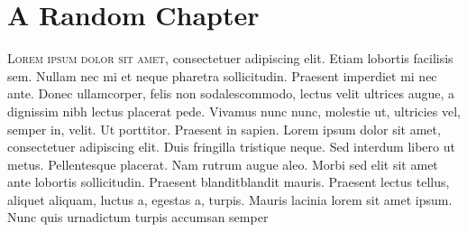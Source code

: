 

\chapter{A Random Chapter}
\lettrine{L}{orem ipsum dolor sit amet}, consectetuer adipiscing elit. Etiam lobortis facilisis sem. Nullam nec mi et neque pharetra sollicitudin. Praesent imperdiet mi nec ante.  Donec ullamcorper, felis non sodalescommodo, lectus velit ultrices augue, a dignissim nibh lectus placerat pede. Vivamus nunc nunc, molestie ut, ultricies vel, semper in, velit. Ut porttitor. Praesent in sapien. Lorem ipsum dolor sit amet, consectetuer adipiscing elit. Duis fringilla tristique neque. Sed interdum libero ut metus. Pellentesque placerat. Nam rutrum augue aleo. Morbi sed elit sit amet ante lobortis sollicitudin. Praesent blanditblandit mauris. Praesent lectus tellus, aliquet aliquam, luctus a, egestas a, turpis. Mauris lacinia lorem sit amet ipsum. Nunc quis urnadictum turpis accumsan semper
